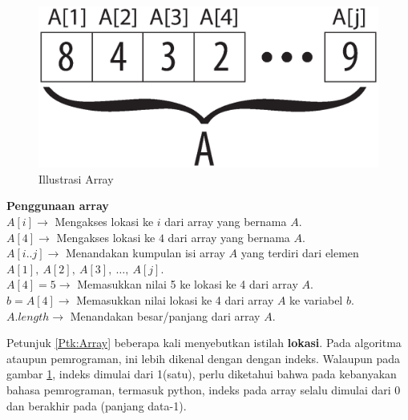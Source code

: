 	\begin{figure}[h!]%
		\Centering
		\includegraphics[scale=0.4]{fig/Array.eps}%
		\caption{Illustrasi Array}%
		\label{fig:illustrasiArray}%
	\end{figure}

\begin{Petunjuk}
\label{Ptk:Array}
	\textbf{Penggunaan array}\\
	$A[i] \rightarrow$ Mengakses lokasi ke $i$ dari array yang bernama $A$.\\
	$A[4] \rightarrow$ Mengakses lokasi ke $4$ dari array yang bernama $A$.\\
	$A[i..j] \rightarrow$ Menandakan kumpulan isi array $A$ yang terdiri dari elemen $A[1],\ A[2],\ A[3],\ \ldots,\ A[j]$.\\
	$A[4] = 5 \rightarrow$ Memasukkan nilai 5 ke lokasi ke 4 dari array $A$.\\
	$b = A[4] \rightarrow$ Memasukkan nilai lokasi ke 4 dari array $A$ ke variabel $b$. \\
	$A.length \rightarrow$ Menandakan besar/panjang dari array $A$. \\
\end{Petunjuk}

	
Petunjuk \ref{Ptk:Array} beberapa kali menyebutkan istilah \textbf{lokasi}. Pada algoritma ataupun pemrograman, ini lebih dikenal dengan dengan indeks. Walaupun pada gambar \ref{fig:illustrasiArray}, indeks dimulai dari 1(satu), perlu diketahui bahwa pada kebanyakan bahasa pemrograman, termasuk python, indeks pada array selalu dimulai dari 0 dan berakhir pada (panjang data-1). \\

